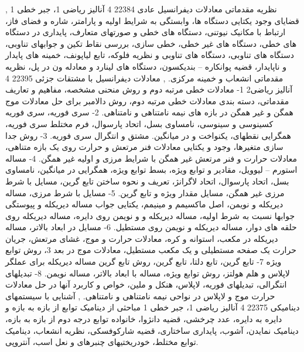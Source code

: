 \documentclass[class=article, crop=false]{standalone}
\begin{document}
{{{{        }}
        },{{
            نظریه مقدماتی معادلات دیفرانسیل عادی
        }{
            22384
        }{
            4
        }{
            آنالیز ریاضی 1، جبر خطی 1
        }{}{{
            قضایای وجود یکتایی دستگاه ها، وابستگی به شرایط اولیه و پارامتر، شاره و فضای فاز، ارتباط با مکانیک نیوتنی، دستگاه های خطی و صورتهای متعارف، پایداری در دستگاه های خطی، دستگاه های غیر خطی، خطی سازی، بررسی نقاط تکین و جوابهای تناوبی، دستگاه های تناوبی، دستگاه های تناوبی و نظریه فلوکه، تابع لیاپونف، خمینه های پایدار و ناپایدار، قضیه پوانکاره – بندیکسون، دستگاه های لینارد و معادله ون در پل، نظریه مقدماتی انشعاب و خمینه مرکزی.
        }}
        },{{
            معادلات دیفرانسیل با مشتقات جزئی
        }{
            22395
        }{
            4
        }{
            آنالیز ریاضی2
        }{}{{
            1- معادلات خطی مرتبه دوم و روش منحنی مشخصه، مفاهیم و تعاریف مقدماتی، دسته بندی معادلات خطی مرتبه دوم، روش دالامبر برای حل معادلات موج همگن و غیر همگن در بازه های نیمه نامتناهی و نامتناهی. 2- سری فوریه، سری فوریه کسینوسی و سینوسی، نامساوی بسل، اتحاد پارسوال، فرم مختلط سری فوریه، همگرایی نقطهای، یکنواخت و در میانگین. مشتق و انتگرال سری فوریه. 3- روش جدا سازی متغیرها، وجود و یکتایی معادلات فنر مرتعش و حرارت روی یک بازه متناهی، معادلات حرارت و فنر مرتعش غیر همگن با شرایط مرزی و اولیه غیر همگن. 4- مساله استورم – لیوویل، مقادیر و توابع ویژه، بسط توابع ویژه، همگرایی در میانگین، نامساوی بسل، اتحاد پارسوال، اتحاد لاگرانژ، تعریف و نحوه ساختن تابع گرین، مسایل با شرط مرزی غیر همگن، مسایل مقدار ویژه و تابع گرین. 5- مسایل با شرط مرزی، مساله دیریکله و نویمن، اصل ماکسیمم و مینیمم، یکتایی جواب مساله دیریکله و پیوستگی جوابها نسبت به شرط اولیه، مساله دیریکله و و نویمن روی دایره، مساله دیریکله روی حلقه های دوار، مساله دیریکله و نویمن روی مستطیل. 6- مسایل در ابعاد بالاتر، مساله دیریکله در مکعب، استوانه و کره، معادلات حرارت و موج، غشای مرتعش، جریان حرارت یک صفحه مستطیلی و یک مکعب مستطیل، معادلات موج در بعد 3، روش توابع ویژه 7- تابع گرین، تابع دلتا، تابع گرین، روش تابع گرین مساله دیریکله برای عملگر لاپلاس و هلم هولتز، روش توابع ویژه، مساله با ابعاد بالاتر، مساله نویمن. 8- تبدیلهای انتگرالی، تبدیلهای فوریه، لاپلاس، هنکل و ملین، خواص و کاربرد آنها در حل معادلات حرارت موج و لاپلاس در نواحی نیمه نامتناهی و نامتناهی.
        }}
        },{{
            آشنایی با سیستمهای دینامیکی
        }{
            22375
        }{
            4
        }{
            آنالیز ریاضی 1، جبر خطی 1
        }{}{{
            مباحثی از دینامیک توابع از بازه به بازه و دایره به دایره، عدد چرخشی، قضیه دانژوا، خانواده توابع درجه دوم از بازه به بازه، دینامیک نمایدن، آشوب، پایداری ساختاری، قضیه شارکوفسکی، نظریه انشعاب، دینامیک توابع مختلط، خودریختیهای چنبرهای و نعل اسب، آنتروپی.
}}}}
\end{document}
